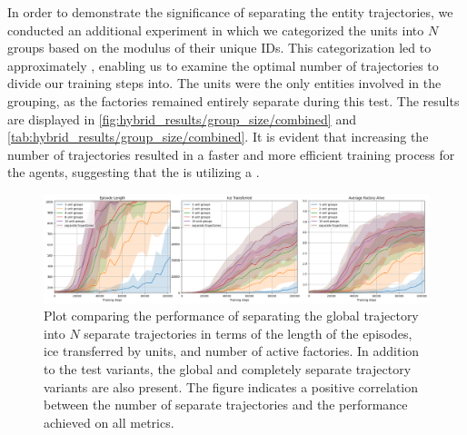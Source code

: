 \label{subsec:modulus-grouping}
\noindent In order to demonstrate the significance of separating the entity trajectories, we conducted an additional experiment in which we categorized the units into $N$ groups based on the modulus of their unique IDs. This categorization led to approximately , enabling us to examine the optimal number of trajectories to divide our training steps into. The units were the only entities involved in the grouping, as the factories remained entirely separate during this test. The results are displayed in \autoref{fig:hybrid_results/group_size/combined} and \autoref{tab:hybrid_results/group_size/combined}. It is evident that increasing the number of trajectories resulted in a faster and more efficient training process for the agents, suggesting that the  is utilizing a .

\begin{figure}[htbp]
    \centering
    \includegraphics[width=0.95\linewidth]{images/results_hybrid/group_size/combined.png}
    \captionsetup{justification=justified, singlelinecheck=false, width=1\linewidth, labelfont=bf} 
    \caption[]{Plot comparing the performance of separating the global trajectory into $N$ separate trajectories in terms of the length of the episodes, ice transferred by units, and number of active factories. In addition to the test variants, the global and completely separate trajectory variants are also present. The figure indicates a positive correlation between the number of separate trajectories and the performance achieved on all metrics.}
    \label{fig:hybrid_results/group_size/combined}
\end{figure}

